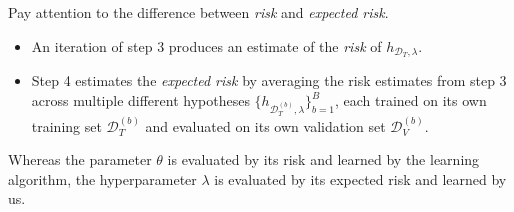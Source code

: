 \begin{remark}
    Pay attention to the difference between
    \emph{risk} and \emph{expected risk}.
    \begin{itemize}
        \item An iteration of step 3 produces an estimate of
        the \emph{risk} of $h_{\mathcal{D}_T, \lambda}$.
        \item Step 4 estimates the \emph{expected risk}
        by averaging the risk estimates from step 3
        across multiple different hypotheses
        $\{h_{\mathcal{D}_T^{(b)}, \lambda}\}_{b = 1}^B$,
        each trained on its own training set $\mathcal{D}_T^{(b)}$
        and evaluated on its own validation set $\mathcal{D}_V^{(b)}$.
    \end{itemize}
\end{remark}

Whereas the parameter $\theta$ is
evaluated by its risk
and learned by the learning algorithm,
the hyperparameter $\lambda$ is
evaluated by its expected risk
and learned by us.

